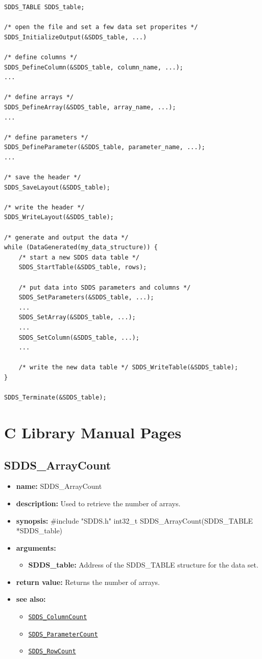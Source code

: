 \documentclass[11pt]{article}
\newcommand{\progref}[1]{\hyperref[SDDS_#1]{\tt SDDS\_#1}}
\begin{document}
\begin{verbatim}
SDDS_TABLE SDDS_table;

/* open the file and set a few data set properites */ 
SDDS_InitializeOutput(&SDDS_table, ...)

/* define columns */ 
SDDS_DefineColumn(&SDDS_table, column_name, ...); 
...

/* define arrays */ 
SDDS_DefineArray(&SDDS_table, array_name, ...);
...

/* define parameters */ 
SDDS_DefineParameter(&SDDS_table, parameter_name, ...); 
...

/* save the header */ 
SDDS_SaveLayout(&SDDS_table);

/* write the header */ 
SDDS_WriteLayout(&SDDS_table);

/* generate and output the data */ 
while (DataGenerated(my_data_structure)) { 
    /* start a new SDDS data table */ 
    SDDS_StartTable(&SDDS_table, rows);

    /* put data into SDDS parameters and columns */ 
    SDDS_SetParameters(&SDDS_table, ...); 
    ... 
    SDDS_SetArray(&SDDS_table, ...); 
    ... 
    SDDS_SetColumn(&SDDS_table, ...); 
    ...

    /* write the new data table */ SDDS_WriteTable(&SDDS_table);
}

SDDS_Terminate(&SDDS_table);
\end{verbatim}

\section{C Library Manual Pages}
\label{ManualPages}
\subsection{SDDS\_ArrayCount}
\label{SDDS_ArrayCount}

\begin{itemize}
\item {\bf name:}\newline
SDDS\_ArrayCount
\item {\bf description:}\newline
Used to retrieve the number of arrays.
\item {\bf synopsis:} \#include "SDDS.h"\newline
int32\_t SDDS\_ArrayCount(SDDS\_TABLE *SDDS\_table)
\item {\bf arguments:}
\begin{itemize}
\item {\bf SDDS\_table:} Address of the SDDS\_TABLE structure for the data set.
\end{itemize}
\item {\bf return value:}\newline
Returns the number of arrays.
\item {\bf see also:}
\begin{itemize}
\item \progref{ColumnCount}
\item \progref{ParameterCount}
\item \progref{RowCount}
\end{itemize}
\end{itemize}
\end{document}
